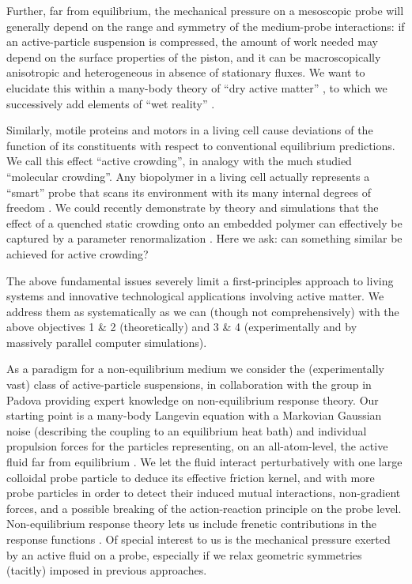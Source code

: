 \begin{workpackage}
\begin{wpdescription}
Further, far from equilibrium, the mechanical pressure on a mesoscopic probe will generally depend on the range and 
symmetry of the medium-probe interactions: if an active-particle suspension is compressed, the
amount of work needed may depend on the surface properties of the piston, and it can be macroscopically
anisotropic and heterogeneous in absence of stationary fluxes. 
%
We want to elucidate this within a many-body theory of ``dry active matter'' \cite{marchetti-etal:2013}, 
to which we successively add elements of ``wet reality'' \cite{zoettl-stark:2014}.

Similarly, motile proteins and motors in a living cell cause deviations of the function
of its constituents with respect to conventional equilibrium predictions.  We call this
effect ``active crowding'', in analogy with the much studied ``molecular crowding''. 
%
Any biopolymer in a living cell actually represents a ``smart'' probe that scans its environment with its many 
internal degrees of freedom \cite{otto-etal:2013}.
%
We could recently demonstrate by theory and simulations that the effect of a quenched static crowding onto an embedded
polymer can effectively be captured by a parameter renormalization \cite{schoebl-etal:2014}.  
%
Here we ask: can something similar be achieved for active crowding?

The above fundamental issues severely limit a first-principles approach to living systems and
innovative technological applications involving active matter.
%
We address them as systematically as we can (though not comprehensively) with the above
objectives 1 \& 2 (theoretically) and 3 \& 4 (experimentally and by massively parallel
computer simulations).

\end{wpdescription}

\begin{tasklist}

\begin{task}[title=Non-Equilibrium Equations of State (NEOS),id=task1,PM=8,lead=Leipzig,partners={Padova,USTUTT},
wphases=0-48!0.5]
As a paradigm for a non-equilibrium medium we consider the (experimentally vast) class of
active-particle suspensions, in collaboration with the group in Padova providing expert knowledge on 
non-equilibrium response theory.
%
Our starting point is a many-body Langevin equation with a Markovian Gaussian noise
(describing the coupling to an equilibrium heat bath) and individual propulsion forces for
the particles representing, on an all-atom-level, the active fluid far from equilibrium \cite{solon-etal:2015}. 
%
We let the fluid interact perturbatively with one large colloidal probe particle to
deduce its effective friction kernel, and with more probe particles in order to
detect their induced mutual interactions, non-gradient forces, and a possible breaking of
the action-reaction principle on the probe level.  
%
Non-equilibrium response theory lets us include frenetic contributions in the response 
functions \cite{baiesi-wynants:2009}.
%
Of special interest to us is the mechanical pressure exerted by an active fluid on a probe, 
especially if we relax geometric symmetries (tacitly) imposed in previous approaches.


\end{task}
\end{tasklist}
\end{workpackage}
